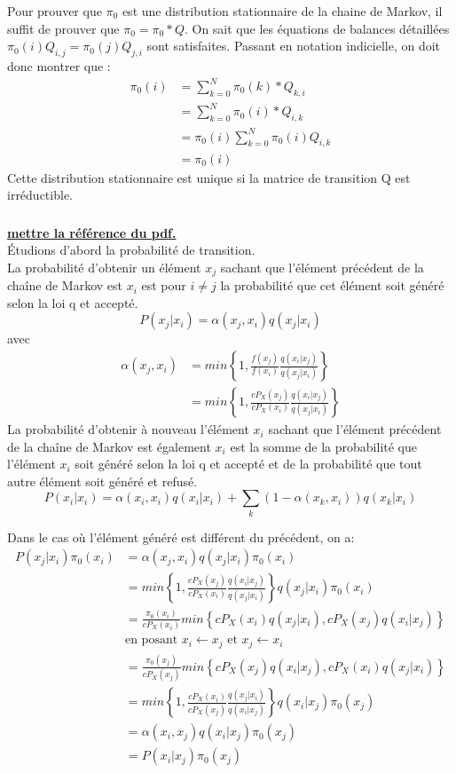 \documentclass[11pt]{report}
\begin{document}
\subsubsection{}
Pour prouver que $\pi_0$ est une distribution stationnaire de la chaine de Markov, il suffit de prouver que $\pi_0=\pi_0 *Q$. 
On sait que les équations de balances détaillées $\pi_0(i)Q_{i,j} = \pi_0(j)Q_{j,i}$ sont satisfaites.
Passant en notation indicielle, on doit donc montrer que :
\begin{align*}
\pi_0(i) &= \sum^{N}_{k=0} \pi_0(k)*Q_{k,i} \\
& = \sum^{N}_{k=0} \pi_0(i)*Q_{i,k} \\
& = \pi_0(i) \sum^{N}_{k=0} \pi_0(i) Q_{i,k} \\
& = \pi_0(i)
\end{align*}
Cette distribution stationnaire est unique si la matrice de transition Q est irréductible.
\subsubsection{}
\underline{\bf{mettre la référence du pdf.}}\\
Étudions d'abord la probabilité de transition.\\
La probabilité d'obtenir un élément $x_j$ sachant que l'élément précédent de la chaîne de Markov est $x_i$ est pour $i \neq j$ la probabilité que cet élément soit généré selon la loi q et accepté.
$$P(x_j | x_i) = \alpha(x_j, x_i) q(x_j| x_i)$$
avec
\begin{align*}
\alpha(x_j, x_i) 
&= min \left\{1, \frac{f(x_j)}{f(x_i)} \frac{q(x_i|x_j)}{q(x_j|x_i)}\right\}\\
&= min \left\{1, \frac{cP_X(x_j)}{cP_X(x_i)} \frac{q(x_i|x_j)}{q(x_j|x_i)}\right\}
\end{align*}
La probabilité d'obtenir à nouveau l'élément $x_i$ sachant que l'élément précédent de la chaîne de Markov est également $x_i$ est la somme de la probabilité que l'élément $x_i$ soit généré selon la loi q et accepté et de la probabilité que tout autre élément soit généré et refusé.
$$P(x_i | x_i) = \alpha(x_i, x_i) q(x_i|x_i) + \sum_k (1-\alpha(x_k, x_i)) q(x_k |x_i)$$

Dans le cas où l'élément généré est différent du précédent, on a:
\begin{align*}
P(x_j | x_i) \pi_0(x_i)
&= \alpha(x_j, x_i) q(x_j| x_i) \pi_0(x_i) \\
&= min \left\{1, \frac{cP_X(x_j)}{cP_X(x_i)} \frac{q(x_i|x_j)}{q(x_j|x_i)}\right\} q(x_j| x_i) \pi_0(x_i) \\
&= \frac{\pi_0(x_i)}{cP_X(x_i)} min \left\{cP_X(x_i) q(x_j|x_i), cP_X(x_j) q(x_i|x_j)\right\} \\
&\text{en posant } x_i \leftarrow x_j \text{ et } x_j \leftarrow x_i \\
&= \frac{\pi_0(x_j)}{cP_X(x_j)} min \left\{cP_X(x_j) q(x_i|x_j), cP_X(x_i) q(x_j|x_i)\right\} \\
&= min \left\{1, \frac{cP_X(x_i)}{cP_X(x_j)} \frac{q(x_j|x_i)}{q(x_i|x_j)}\right\} q(x_i| x_j) \pi_0(x_j)\\
&= \alpha(x_i, x_j) q(x_i| x_j) \pi_0(x_j) \\
&= P(x_i | x_j) \pi_0(x_j)
\end{align*} 
\end{document}
